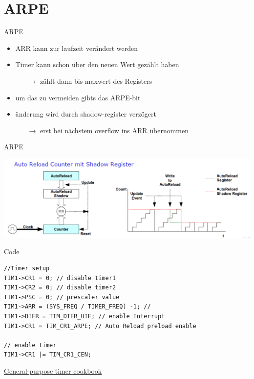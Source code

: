 \documentclass[aspectratio=169,presentation]{beamer}
\newcommand{\sectionframe}[1]{
	\begin{frame}
		\vfill
		\Huge
		\centering
		\usebeamercolor[fg]{title}
		#1
		\vfill
		\par
	\end{frame}
}
\begin{document}
\section{ARPE}
\begin{frame}{ARPE}
  \begin{itemize}
    \item ARR kann zur laufzeit verändert werden
    \item Timer kann schon über den neuen Wert gezählt haben
    \begin{itemize}
      \item[$\rightarrow$] zählt dann bis maxwert des Registers
    \end{itemize}
    \item um das zu vermeiden gibts das ARPE-bit
    \item änderung wird durch shadow-register verzögert
    \begin{itemize}
      \item[$\rightarrow$] erst bei nächstem overflow ins ARR übernommen
    \end{itemize}
  \end{itemize}
\end{frame}

\begin{frame}{ARPE}
  \begin{center}
    \includegraphics[width=\textwidth]{ARPE_enable}    
  \end{center}
\end{frame}

\begin{frame}[fragile]{Code}
  \begin{lstlisting}
//Timer setup
TIM1->CR1 = 0; // disable timer1
TIM1->CR2 = 0; // disable timer2
TIM1->PSC = 0; // prescaler value
TIM1->ARR = (SYS_FREQ / TIMER_FREQ) -1; // 
TIM1->DIER = TIM_DIER_UIE; // enable Interrupt
TIM1->CR1 = TIM_CR1_ARPE; // Auto Reload preload enable

// enable timer
TIM1->CR1 |= TIM_CR1_CEN;
  \end{lstlisting}
\end{frame}

\sectionframe{\href{https://www.st.com/content/ccc/resource/technical/document/application_note/group0/91/01/84/3f/7c/67/41/3f/DM00236305/files/DM00236305.pdf/jcr:content/translations/en.DM00236305.pdf}{General-purpose timer cookbook}}
\end{document}
